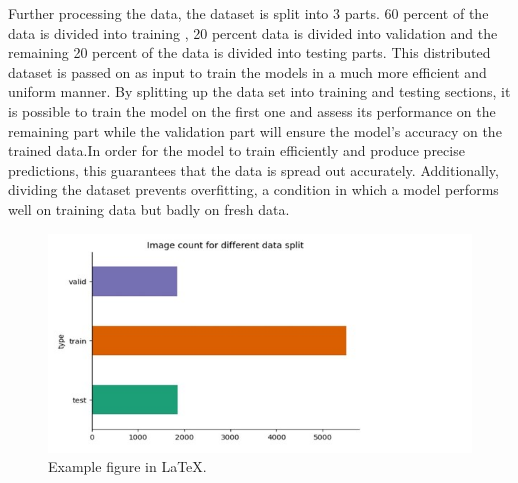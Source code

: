 Further processing the data, the dataset is split into 3 parts. 60 percent of the data is divided into training , 20 percent data is divided into validation and the remaining 20 percent of the data is divided into testing parts. This distributed dataset is passed on as input to train the models in a much more efficient and uniform manner. By splitting up the data set into training and testing sections, it is possible to train the model on the first one and assess its performance on the remaining part while the validation part will ensure the model’s accuracy on the trained data.In order for the model to train efficiently and produce precise predictions, this guarantees that the data is spread out accurately. Additionally, dividing the dataset prevents overfitting, a condition in which a model performs well on training data but badly on fresh data. 
\begin{figure}[ht]
    \centering
    \includegraphics[scale=0.3]{figures/graph2.jpg}
    \caption{Example figure in \LaTeX.}
    \label{fig:chart_a}
\end{figure}


